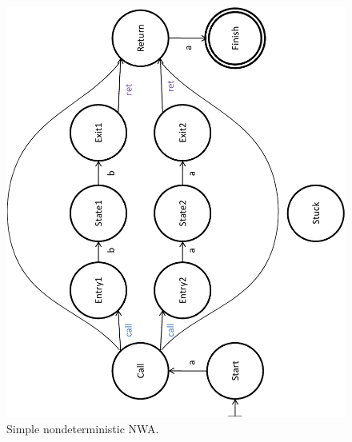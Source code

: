 \begin{figure}[p]
  \centering
    \includegraphics[width=12cm]{Figures/Figure16}
  \caption{Simple nondeterministic NWA.}
  \label{Fig:Det1}
\end{figure}


